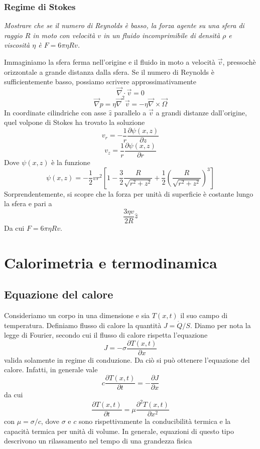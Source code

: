 \documentclass[a4paper,11pt]{article}
\begin{document}
\subsubsection{Regime di Stokes}
\textit{Mostrare che se il numero di Reynolds è basso, la forza agente su una sfera di raggio $R$ in moto con velocità $v$ in un fluido incomprimibile di densità $\rho$ e viscosità $\eta$ è $F=6\pi\eta Rv$.}
\vspace{5mm}

\noindent Immaginiamo la sfera ferma nell'origine e il fluido in moto a velocità $\vec v$, pressochè orizzontale a grande distanza dalla sfera. Se il numero di Reynolds è sufficientemente basso, possiamo scrivere approssimativamente
\[\vec{\nabla}\cdot\vec{v}=0\]
\[\vec{\nabla}p=\eta\vec{\nabla}^2\vec{v}=-\eta\vec{\nabla}\times\vec\Omega\]
In coordinate cilindriche con asse $\hat{z}$ parallelo a $\vec{v}$ a grandi distanze dall'origine, quel volpone di Stokes ha trovato la soluzione
\[v_r=-\frac{1}{r}\frac{\partial\psi(x,z)}{\partial z}\]
\[v_z=\frac{1}{r}\frac{\partial\psi(x,z)}{\partial r}\]
Dove $\psi(x,z)$ è la funzione
\[\psi(x,z)=-\frac{1}{2}vr^2\left[1-\frac{3}{2}\frac{R}{\sqrt{r^2+z^2}}+\frac{1}{2}\left(\frac{R}{\sqrt{r^2+z^2}}\right)^3\right]\]
Sorprendentemente, si scopre che la forza per unità di superficie è costante lungo la sfera e pari a
\[\frac{3\eta v}{2 R}\hat{z}\]
Da cui $F=6\pi\eta Rv$.
\newpage
\section{Calorimetria e termodinamica}
\subsection{Equazione del calore}
Consideriamo un corpo in una dimensione e sia $T(x,t)$ il suo campo di temperatura. Definiamo flusso di calore la quantità $J=\dot{Q}/S$. Diamo per nota la legge di Fourier, secondo cui il flusso di calore rispetta l'equazione
\[J=-\sigma\frac{\partial T(x,t)}{\partial x}\]
valida solamente in regime di conduzione. Da ciò si può ottenere l'equazione del calore. Infatti, in generale vale
\[c\frac{\partial T(x,t)}{\partial t}=-\frac{\partial J}{\partial x}\]
da cui
\[\frac{\partial T(x,t)}{\partial t}=\mu\frac{\partial^2T(x,t)}{\partial x^2}\]
con $\mu=\sigma/c$, dove $\sigma$ e $c$ sono rispettivamente la conducibilità termica e la capacità termica per unità di volume. In generale, equazioni di questo tipo descrivono un rilassamento nel tempo di una grandezza fisica
\end{document}
